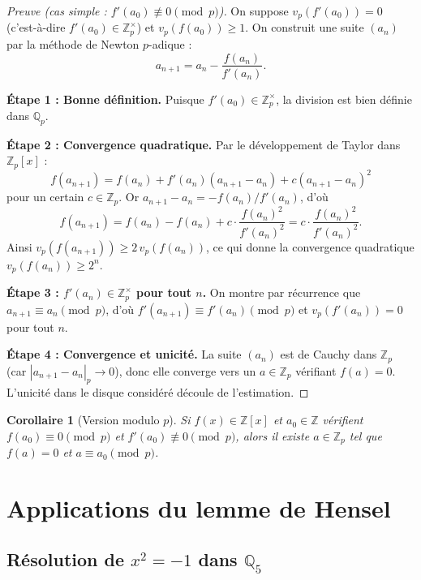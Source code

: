 \documentclass[12pt,a4paper,openany]{book}
\theoremstyle{definition}
\theoremstyle{plain}
\newtheorem{corollaire}[definition]{Corollaire}
\theoremstyle{remark}
\newcommand{\Z}{\mathbb{Z}}
\newcommand{\Q}{\mathbb{Q}}
\newcommand{\abs}[1]{\left|#1\right|}
\begin{document}
\begin{proof}[Preuve (cas simple : $f'(a_0) \not\equiv 0 \pmod{p}$)]
On suppose $v_p(f'(a_0)) = 0$ (c'est-à-dire $f'(a_0) \in \Z_p^{\times}$) et
$v_p(f(a_0)) \geq 1$. On construit une suite $(a_n)$ par la méthode de Newton
$p$-adique :
\[
  a_{n+1} = a_n - \frac{f(a_n)}{f'(a_n)}.
\]

\textbf{Étape 1 : Bonne définition.}
Puisque $f'(a_0) \in \Z_p^{\times}$, la division est bien définie dans $\Q_p$.

\textbf{Étape 2 : Convergence quadratique.}
Par le développement de Taylor dans $\Z_p[x]$ :
\[
  f(a_{n+1}) = f(a_n) + f'(a_n)(a_{n+1} - a_n) + c(a_{n+1} - a_n)^2
\]
pour un certain $c \in \Z_p$. Or $a_{n+1} - a_n = -f(a_n)/f'(a_n)$, d'où
\[
  f(a_{n+1}) = f(a_n) - f(a_n) + c \cdot \frac{f(a_n)^2}{f'(a_n)^2}
  = c \cdot \frac{f(a_n)^2}{f'(a_n)^2}.
\]
Ainsi $v_p(f(a_{n+1})) \geq 2\, v_p(f(a_n))$, ce qui donne la convergence
quadratique $v_p(f(a_n)) \geq 2^n$.

\textbf{Étape 3 : $f'(a_n) \in \Z_p^{\times}$ pour tout $n$.}
On montre par récurrence que $a_{n+1} \equiv a_n \pmod{p}$, d'où
$f'(a_{n+1}) \equiv f'(a_n) \pmod{p}$ et $v_p(f'(a_n)) = 0$ pour tout $n$.

\textbf{Étape 4 : Convergence et unicité.}
La suite $(a_n)$ est de Cauchy dans $\Z_p$ (car $\abs{a_{n+1}-a_n}_p \to 0$),
donc elle converge vers un $a \in \Z_p$ vérifiant $f(a) = 0$. L'unicité dans le
disque considéré découle de l'estimation.
\end{proof}

\begin{corollaire}[Version modulo $p$]
\label{cor:hensel-mod-p}
Si $f(x) \in \Z[x]$ et $a_0 \in \Z$ vérifient $f(a_0) \equiv 0 \pmod{p}$ et
$f'(a_0) \not\equiv 0 \pmod{p}$, alors il existe $a \in \Z_p$ tel que $f(a) = 0$
et $a \equiv a_0 \pmod{p}$.
\end{corollaire}


\section{Applications du lemme de Hensel}
\label{sec:applications-hensel}

\subsection{Résolution de $x^2 = -1$ dans $\Q_5$}
\label{subsec:x2-moins1-Q5}
\end{document}
